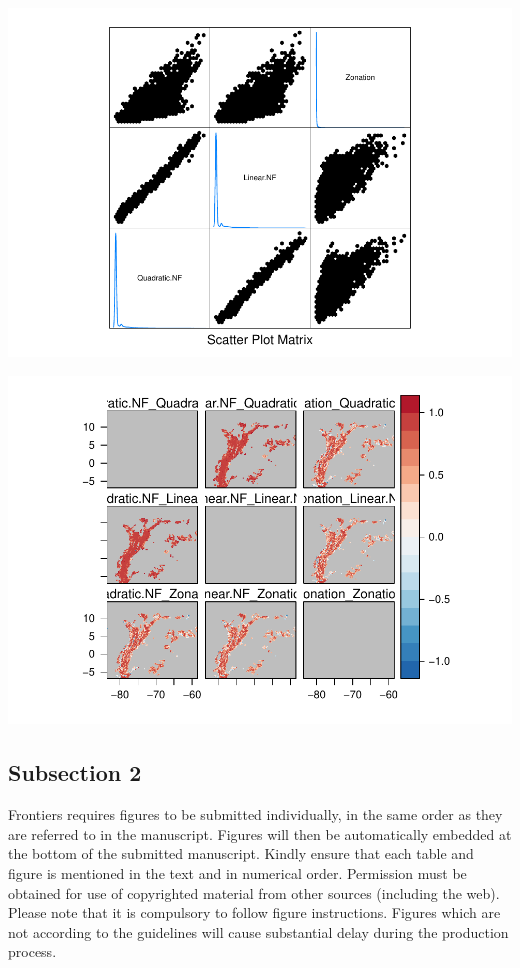 \documentclass[]{article}
\begin{document}
\includegraphics{NFPaper_files/figure-latex/unnamed-chunk-6-1.pdf}

\includegraphics{NFPaper_files/figure-latex/unnamed-chunk-7-1.pdf}

\hypertarget{subsection-2}{%
\subsection*{Subsection 2}\label{subsection-2}}

Frontiers requires figures to be submitted individually, in the same order as
they are referred to in the manuscript. Figures will then be automatically
embedded at the bottom of the submitted manuscript. Kindly ensure that each
table and figure is mentioned in the text and in numerical order. Permission
must be obtained for use of copyrighted material from other sources (including
the web). Please note that it is compulsory to follow figure instructions.
Figures which are not according to the guidelines will cause substantial delay
during the production process.
\end{document}

